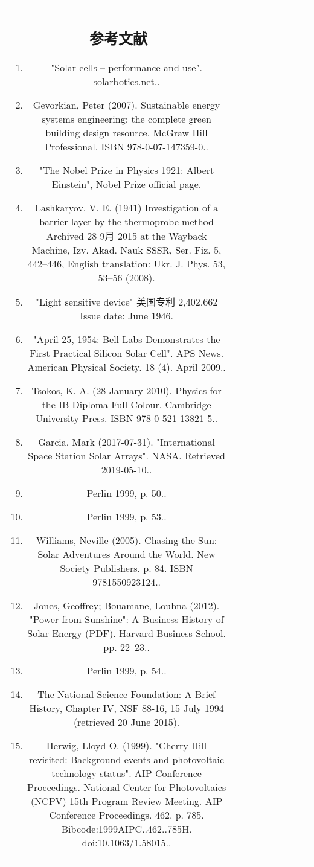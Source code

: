 \begin{table}[ht]
\begin{tabular}{|c|c|c|c|c|c|c|c|c}
\subsection{参考文献}

\begin{enumerate}
\item "Solar cells – performance and use". solarbotics.net..
\item Gevorkian, Peter (2007). Sustainable energy systems engineering: the complete green building design resource. McGraw Hill Professional. ISBN 978-0-07-147359-0..
\item "The Nobel Prize in Physics 1921: Albert Einstein", Nobel Prize official page.
\item Lashkaryov, V. E. (1941) Investigation of a barrier layer by the thermoprobe method Archived 28 9月 2015 at the Wayback Machine, Izv. Akad. Nauk SSSR, Ser. Fiz. 5, 442–446, English translation: Ukr. J. Phys. 53, 53–56 (2008).
\item "Light sensitive device" 美国专利 2,402,662 Issue date: June 1946.
\item "April 25, 1954: Bell Labs Demonstrates the First Practical Silicon Solar Cell". APS News. American Physical Society. 18 (4). April 2009..
\item Tsokos, K. A. (28 January 2010). Physics for the IB Diploma Full Colour. Cambridge University Press. ISBN 978-0-521-13821-5..
\item Garcia, Mark (2017-07-31). "International Space Station Solar Arrays". NASA. Retrieved 2019-05-10..
\item Perlin 1999, p. 50..
\item Perlin 1999, p. 53..
\item Williams, Neville (2005). Chasing the Sun: Solar Adventures Around the World. New Society Publishers. p. 84. ISBN 9781550923124..
\item Jones, Geoffrey; Bouamane, Loubna (2012). "Power from Sunshine": A Business History of Solar Energy (PDF). Harvard Business School. pp. 22–23..
\item Perlin 1999, p. 54..
\item The National Science Foundation: A Brief History, Chapter IV, NSF 88-16, 15 July 1994 (retrieved 20 June 2015).
\item Herwig, Lloyd O. (1999). "Cherry Hill revisited: Background events and photovoltaic technology status". AIP Conference Proceedings. National Center for Photovoltaics (NCPV) 15th Program Review Meeting. AIP Conference Proceedings. 462. p. 785. Bibcode:1999AIPC..462..785H. doi:10.1063/1.58015..

\end{enumerate}
\end{tabular}
\end{table}
